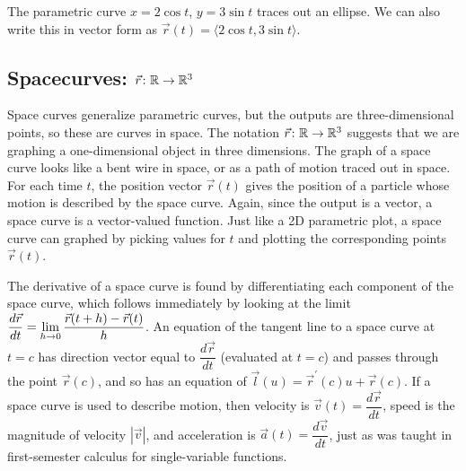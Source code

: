 \begin{example}
  The parametric curve $x=2\cos t$, $y=3\sin t$ traces out an ellipse.
  We can also write this in vector form as $\vec r(t) = \langle2\cos
  t, 3\sin t\rangle$.
\end{example}

\subsection{Spacecurves: {$\vec r\colon \mathbb{R}\to \mathbb{R}^3$}}
Space curves generalize parametric curves, but the outputs are
three-dimensional points, so these are curves in space.  The notation
{$\vec r\colon \mathbb{R} \to \mathbb{R}^3$} suggests that we are graphing a
one-dimensional object in three dimensions. The graph of a space curve
looks like a bent wire in space, or as a path of motion traced out in
space.  For each time $t$, the position vector $\vec r(t)$ gives the
position of a particle whose motion is described by the space curve.
Again, since the output is a vector, a space curve is a vector-valued
function.  Just like a 2D parametric plot, a space curve can graphed
by picking values for $t$ and plotting the corresponding points $\vec
r(t)$.

The derivative of a space curve is found by differentiating each
component of the space curve, which follows immediately by looking at
the limit $\displaystyle\frac{d\vec r}{dt}=\lim_{h\to 0}\frac{\vec r(t+h)-\vec
  r(t)}{h}$. An equation of the tangent line to a space curve at $t=c$
has direction vector equal to $\dfrac{d\vec r}{dt}$ (evaluated at
$t=c$) and passes through the point $\vec r(c)$, and so has an equation of
$\vec l(u) = \vec r^\prime(c)u+\vec r(c)$. If a space curve is used to
describe motion, then velocity is $\vec v(t) = \dfrac{d\vec r}{dt}$,
speed is the magnitude of velocity $|\vec v|$, and acceleration is
$\vec a(t) = \dfrac{d\vec v}{dt}$, just as was taught in first-semester
calculus for single-variable functions.


